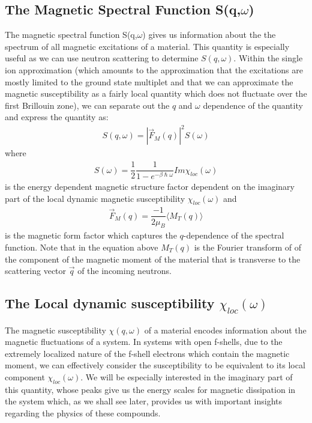 \documentclass[10pt]{ruthesis}
\begin{document}
{\subsection{The Magnetic Spectral Function S(q,$\omega$)}
The magnetic spectral function S(q,$\omega$) gives us information about the the spectrum of all magnetic excitations of a material. This quantity is especially useful as we can use neutron scattering to determine $S(q, \omega)$. Within the single ion approximation (which amounts to the approximation that the excitations are mostly limited to the ground state multiplet and that we can approximate the magnetic susceptibility as a fairly local quantity which does not fluctuate over the first Brillouin zone), we can separate out the $q$ and $\omega$ dependence of the quantity and express the quantity as:
\begin{align}
S(q,\omega)=|\vec{F}_{M}(q)|^{2} S(\omega)
\end{align}
where
\begin{align}
S(\omega)=\dfrac{1}{2}\dfrac{1}{1-e^{-\beta\hslash\omega}}Im \chi_{loc}(\omega)
\end{align}
is the energy dependent magnetic structure factor dependent on the imaginary part of the local dynamic magnetic susceptibility $\chi_{loc}(\omega)$ and
\begin{align}
\vec{F}_{M}(q)=\dfrac{-1}{2\mu_{B}}\langle M_{T}(q) \rangle
\end{align}
is the magnetic form factor which captures the $q$-dependence of the spectral function. Note that in the equation above $M_{T}(q)$ is the  Fourier transform of  of the component of the magnetic moment of the material that is transverse to the scattering vector $\vec{q}$ of the incoming neutrons.

\subsection{The Local dynamic susceptibility $\chi_{loc}(\omega)$ }
The magnetic susceptibility $\chi(q,\omega)$ of a material encodes information about the magnetic fluctuations of a system. In systems with open f-shells, due to the extremely localized nature of the f-shell electrons which contain the magnetic moment, we can effectively consider the susceptibility to be equivalent to its local component $\chi_{loc}(\omega)$. We will be especially interested in the imaginary part of this quantity, whose peaks give us the energy scales for magnetic dissipation in the system which, as we shall see later, provides us with important insights regarding the physics of these compounds.

}
\end{document}

